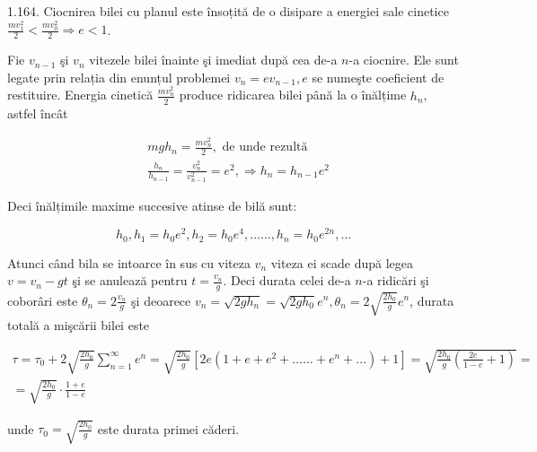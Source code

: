 \documentclass[10pt]{article}
\begin{document}
1.164. Ciocnirea bilei cu planul este însoțită de o disipare a energiei sale cinetice $\frac{m v_{1}^{2}}{2}<\frac{m v_{0}^{2}}{2} \Rightarrow e<1$.

Fie $v_{n-1}$ şi $v_{n}$ vitezele bilei înainte şi imediat după cea de-a $n$-a ciocnire. Ele sunt legate prin relația din enunțul problemei $v_{n}=e v_{n-1}, e$ se numeşte coeficient de restituire. Energia cinetică $\frac{m v_{n}^{2}}{2}$ produce ridicarea bilei până la o înălțime $h_{n}$, astfel încât

$$
\begin{aligned}
& m g h_{n}=\frac{m v_{n}^{2}}{2}, \text { de unde rezultă } \\
& \frac{h_{n}}{h_{n-1}}=\frac{v_{n}^{2}}{v_{n-1}^{2}}=e^{2}, \Rightarrow h_{n}=h_{n-1} e^{2}
\end{aligned}
$$

Deci înălțimile maxime succesive atinse de bilă sunt:

$$
h_{0}, h_{1}=h_{0} e^{2}, h_{2}=h_{0} e^{4}, \ldots \ldots, h_{n}=h_{0} e^{2 n}, \ldots
$$

Atunci când bila se intoarce în sus cu viteza $v_{n}$ viteza ei scade după legea $v=v_{n}-g t$ şi se anulează pentru $t=\frac{v_{n}}{g}$. Deci durata celei de-a $n$-a ridicări şi coborâri este $\theta_{n}=2 \frac{v_{n}}{g}$ şi deoarece $v_{n}=\sqrt{2 g h_{n}}=\sqrt{2 g h_{0}} e^{n}, \theta_{n}=2 \sqrt{\frac{2 h_{0}}{g}} e^{n}$, durata totală a mişcării bilei este

$$
\begin{gathered}
\tau=\tau_{0}+2 \sqrt{\frac{2 h_{0}}{g}} \sum_{n=1}^{\infty} e^{n}=\sqrt{\frac{2 h_{0}}{g}}\left[2 e\left(1+e+e^{2}+\ldots \ldots+e^{n}+\ldots\right)+1\right]=\sqrt{\frac{2 h_{0}}{g}\left(\frac{2 e}{1-e}+1\right)}= \\
=\sqrt{\frac{2 h_{0}}{g}} \cdot \frac{1+e}{1-e}
\end{gathered}
$$

unde $\tau_{0}=\sqrt{\frac{2 h_{0}}{g}}$ este durata primei căderi.
\end{document}
